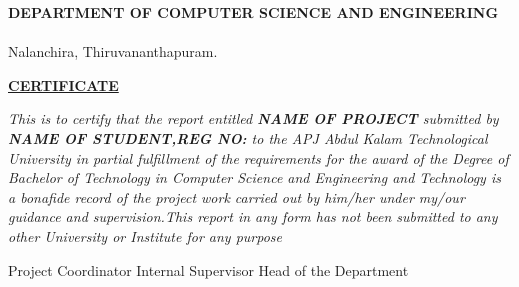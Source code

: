 
\setlength{\headsep}{0.4in}
\begin{center}

{\sf \textbf{\textcolor[rgb]{0,0,0}{DEPARTMENT OF COMPUTER SCIENCE AND ENGINEERING}}}\\[0.5ex]
{}\\[0.4ex]
Nalanchira, Thiruvananthapuram.



\end{center}


\vspace{0.15cm}
 \begin{figure}[!h]
 \begin{center}
 \end{center}
 \end{figure}
\vspace{0.02cm}

\begin{center}
\textcolor[rgb]{0,0,0}{\textbf{\underline{CERTIFICATE}}} \\[1ex]
\end{center}
\par
\emph{
\textit{{This is to certify that the report entitled \textbf{NAME OF PROJECT}  submitted by \textbf{NAME OF STUDENT,REG NO:} to the APJ Abdul Kalam Technological University in partial fulfillment of the
		requirements for the award of the Degree of {Bachelor of Technology} in {Computer Science and Engineering and Technology} is a bonafide record of the project work carried out by him/her under my/our guidance and supervision.This report in any form has not been submitted to any other University or Institute for any purpose}}} 



\vspace{1.0 cm}
\vspace{1.5 cm}
\vspace{1.0 cm}
\vspace{1.5 cm}

Project Coordinator		\hspace{0.8 cm}	Internal Supervisor		\hspace{1.5 cm}	Head of the Department






